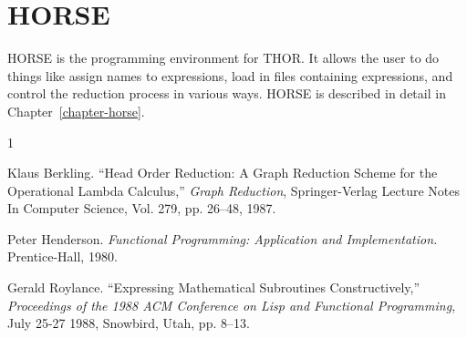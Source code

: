 \section{HORSE}

	HORSE is the programming environment for THOR.  It allows
the user to do things like assign names to expressions, load in
files containing expressions, and control the reduction process
in various ways.  HORSE is described in detail in Chapter~\ref{chapter-horse}.






\begin{thebibliography}{1}

 Klaus Berkling. ``Head Order Reduction:  A Graph
Reduction Scheme for the Operational Lambda Calculus,'' {\em Graph
Reduction}, Springer-Verlag Lecture Notes In Computer Science, Vol. 279,
pp. 26--48, 1987.

 Peter Henderson. {\em Functional Programming: 
Application and Implementation.}  Prentice-Hall, 1980. 

 Gerald Roylance.  ``Expressing Mathematical
Subroutines Constructively,'' {\em Proceedings of the 1988 ACM Conference on
Lisp and Functional Programming}, July 25-27 1988, Snowbird, Utah, pp. 8--13.

\end{thebibliography}


